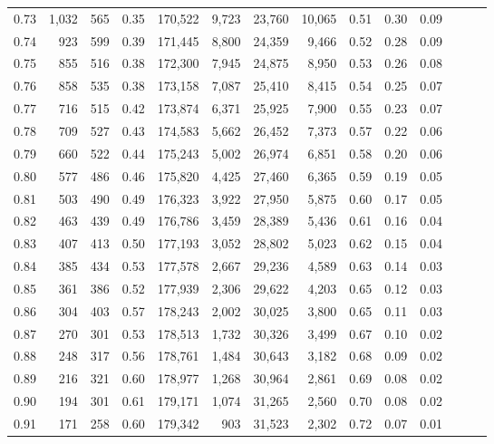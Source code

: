\begin{tabular}{rrrrrrrrrrrrrr}
0.73 &  1,032 &  565 &  0.35 &  170,522 &    9,723 &  23,760 &  10,065 &  0.51 &  0.30 &      0.09 \\
0.74 &    923 &  599 &  0.39 &  171,445 &    8,800 &  24,359 &   9,466 &  0.52 &  0.28 &      0.09 \\
0.75 &    855 &  516 &  0.38 &  172,300 &    7,945 &  24,875 &   8,950 &  0.53 &  0.26 &      0.08 \\
0.76 &    858 &  535 &  0.38 &  173,158 &    7,087 &  25,410 &   8,415 &  0.54 &  0.25 &      0.07 \\
0.77 &    716 &  515 &  0.42 &  173,874 &    6,371 &  25,925 &   7,900 &  0.55 &  0.23 &      0.07 \\
0.78 &    709 &  527 &  0.43 &  174,583 &    5,662 &  26,452 &   7,373 &  0.57 &  0.22 &      0.06 \\
0.79 &    660 &  522 &  0.44 &  175,243 &    5,002 &  26,974 &   6,851 &  0.58 &  0.20 &      0.06 \\
0.80 &    577 &  486 &  0.46 &  175,820 &    4,425 &  27,460 &   6,365 &  0.59 &  0.19 &      0.05 \\
0.81 &    503 &  490 &  0.49 &  176,323 &    3,922 &  27,950 &   5,875 &  0.60 &  0.17 &      0.05 \\
0.82 &    463 &  439 &  0.49 &  176,786 &    3,459 &  28,389 &   5,436 &  0.61 &  0.16 &      0.04 \\
0.83 &    407 &  413 &  0.50 &  177,193 &    3,052 &  28,802 &   5,023 &  0.62 &  0.15 &      0.04 \\
0.84 &    385 &  434 &  0.53 &  177,578 &    2,667 &  29,236 &   4,589 &  0.63 &  0.14 &      0.03 \\
0.85 &    361 &  386 &  0.52 &  177,939 &    2,306 &  29,622 &   4,203 &  0.65 &  0.12 &      0.03 \\
0.86 &    304 &  403 &  0.57 &  178,243 &    2,002 &  30,025 &   3,800 &  0.65 &  0.11 &      0.03 \\
0.87 &    270 &  301 &  0.53 &  178,513 &    1,732 &  30,326 &   3,499 &  0.67 &  0.10 &      0.02 \\
0.88 &    248 &  317 &  0.56 &  178,761 &    1,484 &  30,643 &   3,182 &  0.68 &  0.09 &      0.02 \\
0.89 &    216 &  321 &  0.60 &  178,977 &    1,268 &  30,964 &   2,861 &  0.69 &  0.08 &      0.02 \\
0.90 &    194 &  301 &  0.61 &  179,171 &    1,074 &  31,265 &   2,560 &  0.70 &  0.08 &      0.02 \\
0.91 &    171 &  258 &  0.60 &  179,342 &      903 &  31,523 &   2,302 &  0.72 &  0.07 &      0.01 \\

\end{tabular}
